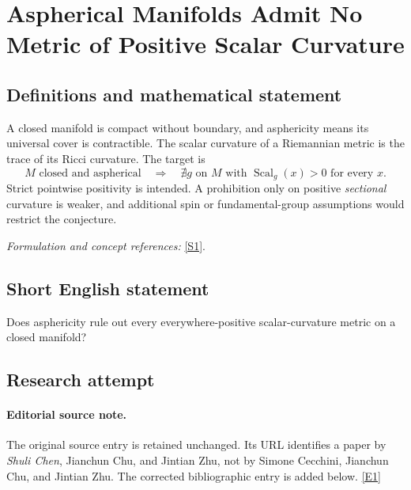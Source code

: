\documentclass[11pt,a4paper]{article}
\newcommand{\sref}[2]{\hyperlink{source:#1:#2}{[S#2]}}
\newcommand{\eref}[2]{\hyperlink{extra:#1:#2}{[E#2]}}
\newif\ifshowcatalogue
\newcommand{\cataloguescope}[1]{\ifshowcatalogue
 \paragraph{Exact scope in the supplied catalogue.}
 \begin{quote}\small #1\end{quote}\fi}
\numberwithin{equation}{section}
\begin{document}
\setcounter{section}{122}
\setlength{\parskip}{3pt plus 1pt}
\clearpage
\section{\texorpdfstring{Aspherical Manifolds Admit No Metric of Positive Scalar Curvature}{Aspherical Manifolds Admit No Metric of Positive Scalar Curvature}}\label{123}
\subsection{Definitions and mathematical statement}
A closed manifold is compact without boundary, and asphericity means its universal cover is contractible. The scalar curvature of a Riemannian metric is the trace of its Ricci curvature. The target is
\[
 M\text{ closed and aspherical}\quad\Longrightarrow\quad
 \nexists g\text{ on }M\text{ with }\operatorname{Scal}_g(x)>0\text{ for every }x.
\]
Strict pointwise positivity is intended. A prohibition only on positive \emph{sectional} curvature is weaker, and additional spin or fundamental-group assumptions would restrict the conjecture.
\par\smallskip\textit{Formulation and concept references:} \sref{123}{1}.
\cataloguescope{Prove or disprove that no closed aspherical manifold admits a Riemannian metric of positive scalar curvature.}
\subsection{Short English statement}
Does asphericity rule out every everywhere-positive scalar-curvature metric on a closed manifold?
\subsection{Research attempt}

\paragraph{Editorial source note.}
The original source entry is retained unchanged.  Its URL identifies a
paper by \emph{Shuli Chen}, Jianchun Chu, and Jintian Zhu, not by Simone
Cecchini, Jianchun Chu, and Jintian Zhu.  The corrected bibliographic
entry is added below. \eref{123}{1}
\end{document}
